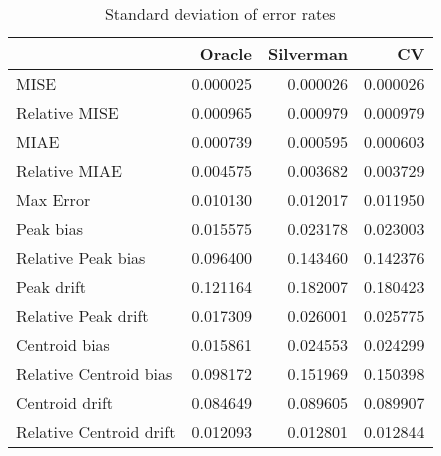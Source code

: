 \begin{table}[ht]
\centering
\begin{tabular}{lrrr}
  \hline
 & Oracle & Silverman & CV \\ 
  \hline
MISE & 0.000025 & 0.000026 & 0.000026 \\ 
  Relative MISE & 0.000965 & 0.000979 & 0.000979 \\ 
  MIAE & 0.000739 & 0.000595 & 0.000603 \\ 
  Relative MIAE & 0.004575 & 0.003682 & 0.003729 \\ 
  Max Error & 0.010130 & 0.012017 & 0.011950 \\ 
  Peak bias & 0.015575 & 0.023178 & 0.023003 \\ 
  Relative Peak bias & 0.096400 & 0.143460 & 0.142376 \\ 
  Peak drift & 0.121164 & 0.182007 & 0.180423 \\ 
  Relative Peak drift & 0.017309 & 0.026001 & 0.025775 \\ 
  Centroid bias & 0.015861 & 0.024553 & 0.024299 \\ 
  Relative Centroid bias & 0.098172 & 0.151969 & 0.150398 \\ 
  Centroid drift & 0.084649 & 0.089605 & 0.089907 \\ 
  Relative Centroid drift & 0.012093 & 0.012801 & 0.012844 \\ 
   \hline
\end{tabular}
\caption{Standard deviation of error rates} 
\label{tbl:stddev_error_rates}
\end{table}
